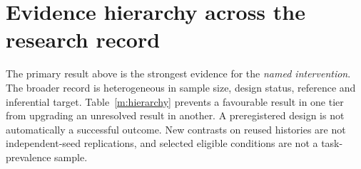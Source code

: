 \documentclass[10pt]{article}
\begin{document}
\clearpage




\clearpage
\section{Evidence hierarchy across the research record}\label{m:evidence}
The primary result above is the strongest evidence for the \emph{named intervention}. The broader record is heterogeneous in sample size, design status, reference and inferential target. Table~\ref{m:hierarchy} prevents a favourable result in one tier from upgrading an unresolved result in another. A preregistered design is not automatically a successful outcome. New contrasts on reused histories are not independent-seed replications, and selected eligible conditions are not a task-prevalence sample.
\end{document}
